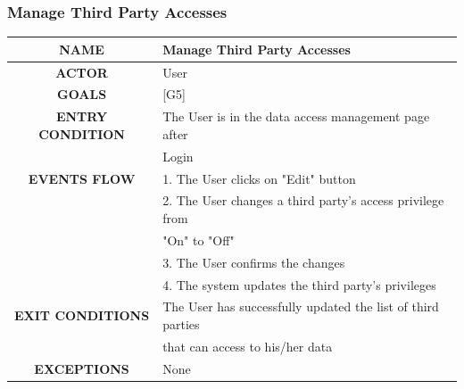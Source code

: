 \documentclass[12pt,a4paper]{article}
\begin{document}
		\subsubsection{Manage Third Party Accesses}
		\begin{center}
			\begin{tabular}{| c | l |}
				\hline
				\textbf{NAME} & Manage Third Party Accesses \\
				\hline
				\textbf{ACTOR} & User \\
				\hline
				\textbf{GOALS} & [G5] \\
				\hline
				\textbf{ENTRY CONDITION} & The User is in the data access management page after \\
				& Login\\ 
				\hline
				\textbf{EVENTS FLOW}  &
				1. The User clicks on "Edit" button\\
				&2. The User changes a third party's access privilege from \\
				&"On" to "Off" \\
				&3. The User confirms the changes\\
				&4. The system updates the third party's privileges \\ 
				\hline
				\textbf{EXIT CONDITIONS}
				& The User has successfully updated the list of third parties \\
				& that can access to his/her data\\ \hline
				\textbf{EXCEPTIONS} &
				None \\
				\hline
			\end{tabular}
		\end{center}
	
\end{document}
